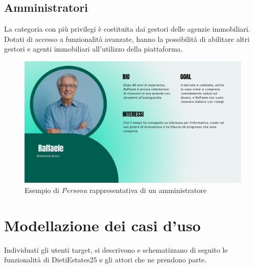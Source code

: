 \documentclass{book}
\begin{document}
\clearpage
\subsection{Amministratori}
La categoria con più privilegi è costituita dai gestori delle agenzie immobiliari. Dotati di accesso a funzionalità avanzate, hanno la possibilità di abilitare altri gestori e agenti immobiliari all'utilizzo della piattaforma.

\begin{figure}[!htb]
    \includegraphics[width=\textwidth]{figures/adminPersona.pdf}
    \centering
    \caption{Esempio di \textit{Persona} rappresentativa di un amministratore}
\end{figure}

\section{Modellazione dei casi d'uso}
Individuati gli utenti target, si descrivono e schematizzano di seguito le funzionalità di DietiEstates25 e gli attori che ne prendono parte.
\end{document}
